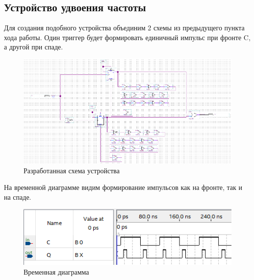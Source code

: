 \documentclass[a4paper,12pt]{article}
\begin{document}
    \subsection{Устройство удвоения частоты}
    Для создания подобного устройства объединим 2 схемы из предыдущего пункта хода работы.
    Один триггер будет формировать единичный импульс при фронте C, а другой при спаде.
    \begin{figure}[H]
		\centering
		\includegraphics[width=0.9\linewidth]{polytech/scheme/report-lab3/subfiles/images/scheme-7}
		\caption{Разработанная схема устройства}
		\label{fig:scheme-7}
	\end{figure}
    На временной диаграмме видим формирование импульсов как на фронте, так и на спаде.
    \begin{figure}[H]
		\centering
		\includegraphics[width=0.9\linewidth]{polytech/scheme/report-lab3/subfiles/images/wave-7}
		\caption{Временная диаграмма}
		\label{fig:wave-7}
	\end{figure}
\end{document}
